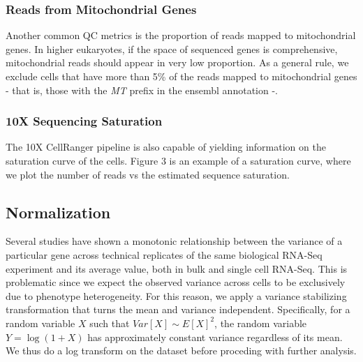 

\subsubsection{Reads from Mitochondrial Genes}
Another common QC metrics is the proportion of reads mapped to mitochondrial genes. In higher eukaryotes, if the space of sequenced genes is comprehensive, mitochondrial reads should appear in very low proportion. As a general rule, we exclude cells that have more than 5\% of the reads mapped to mitochondrial genes - that is, those with the \emph{MT} prefix in the ensembl annotation -.


\subsubsection{10X Sequencing Saturation}
The 10X CellRanger pipeline is also capable of yielding information on the saturation curve of the cells. Figure 3 is an example of a saturation curve, where  we plot the number of reads vs the estimated sequence saturation. 

\newpage
\subsection{Normalization}
Several studies have shown a monotonic relationship between the variance of a particular gene across technical replicates of the same biological RNA-Seq experiment and its average value, both in bulk \cite{anders2010differential} and single cell RNA-Seq\cite{kharchenko2014bayesian}. This is problematic since we expect the observed variance across cells to be exclusively due to phenotype heterogeneity. For this reason, we apply a variance stabilizing transformation that turns the mean and variance independent. Specifically, for a random variable $X$ such that $Var[X] \sim E[X]^2$, the random variable $Y = \log(1+X)$ has approximately constant variance regardless of its mean. We thus do a log transform on the dataset before proceding with further analysis.

